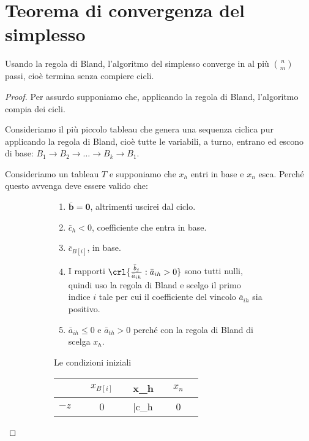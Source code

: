 \documentclass[\main/main.tex]{subfiles}
\begin{document}
\section{Teorema di convergenza del simplesso}

\begin{theorem}
  Usando la regola di Bland, l'algoritmo del simplesso converge in al più $\binom{n}{m}$ passi, cioè termina senza compiere cicli.
\end{theorem}

\begin{proof}
  Per assurdo supponiamo che, applicando la regola di Bland, l'algoritmo compia dei cicli.

  Consideriamo il più piccolo tableau che genera una sequenza ciclica pur applicando la regola di Bland, cioè tutte le variabili, a turno, entrano ed escono di base: $B_1 \rightarrow B_2 \rightarrow \ldots \rightarrow B_k \rightarrow B_1$.

  Consideriamo un tableau $T$ e supponiamo che $x_h$ entri in base e $x_n$ esca. Perché questo avvenga deve essere valido che:

  \begin{figure}
    \begin{subfigure}{0.49\textwidth}
      \begin{enumerate}
        \item $\bar{\bm{b}} = \bm{0}$, altrimenti uscirei dal ciclo.
        \item $\bar{c}_h < 0$, coefficiente che entra in base.
        \item $\bar{c}_{B[i]}$, in base.
        \item I rapporti $\crl{\frac{\bar{b}_j}{\bar{a}_{ih}}:\bar{a}_{ih}>0}$ sono tutti nulli, quindi uso la regola di Bland e scelgo il primo indice $i$ tale per cui il coefficiente del vincolo $\bar{a}_{ih}$ sia positivo.
        \item $\bar{a}_{ih} \leq 0$ e  $\bar{a}_{th} > 0$ perché con la regola di Bland di scelga $x_h$.
      \end{enumerate}
      \caption{Le condizioni iniziali}
    \end{subfigure}
    \begin{subfigure}{0.49\textwidth}
      \begin{table}
        \begin{tabular}{c|LcLLLc|L}
                       &  & $x_{B[i]}$ &  & x_h          &  & $x_n$ &   \\
          \hline
          $-z$         &  & 0          &  & \bar{c}_h    &  & 0     &   \\
          \hline


\end{tabular}
\end{table}
\end{subfigure}
\end{figure}
\end{proof}
\end{document}
